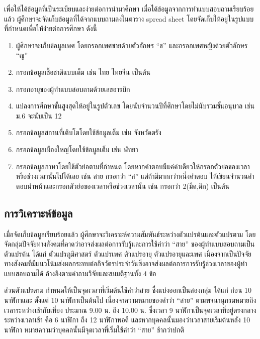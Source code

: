 \documentclass[a4paper]{article}
\begin{document}
    เพื่อให้ได้ข้อมูลที่เป็นระเบียบและง่ายต่อการนำมาศึกษา เมื่อได้ข้อมูลจากการทำแบบสอบถามเรียบร้อยแล้ว ผู้ศึกษาจะจัดเก็บข้อมูลที่ได้จากแบบถามลงในตาราง spread sheet โดยจัดเก็บให้อยู่ในรูปแบบที่กำหนดเพื่อให้ง่ายต่อการศึกษา ดังนี้
    \begin{enumerate}
        \item ผู้ศึกษาจะเก็บข้อมูลเพศ โดยกรอกเพศชายด้วยตัวอักษร “ช” และกรอกเพศหญิงด้วยตัวอักษร “ญ”
        \item กรอกข้อมูลเชื้อชาติแบบเต็ม เช่น ไทย ไทยจีน เป็นต้น
        \item กรอกอายุของผู้ทำแบบสอบถามด้วยเลขอารบิก
        \item แปลงการศึกษาขั้นสูงสุดให้อยู่ในรูปตัวเลข โดยนับจำนวนปีที่ศึกษาโดยไม่นับรวมชั้นอนุบาล เช่น ม.6 จะนับเป็น 12
        \item กรอกข้อมูลสถานที่เติบโตโดยใช้ข้อมูลเต็ม เช่น จังหวัดตรัง
        \item กรอกข้อมูลเมืองใหญ่โดยใช้ข้อมูลเต็ม เช่น พัทยา
        \item กรอกข้อมูลภาษาโดยใช้ตัวย่อตามที่กำหนด โดยหากคำตอบมีแค่คำเดียวให้กรอกตัวย่อของเวลาหรือช่วงเวลานั้นไปได้เลย เช่น สาย กรอกว่า “ส” แต่ถ้ามีมากกว่าหนึ่งคำตอบ ให้เขียนจำนวนคำตอบนำหน้าและกรอกตัวย่อของเวลาหรือช่วงเวลานั้น เช่น กรอกว่า 2(มืด,ดึก) เป็นต้น
    \end{enumerate}
\subsection{การวิเคราะห์ข้อมูล}
    เมื่อจัดเก็บข้อมูลเรียบร้อยแล้ว ผู้ศึกษาจะวิเคราะห์ความสัมพันธ์ระหว่างตัวแปรต้นและตัวแปรตาม โดยจัดกลุ่มปัจจัยทางสังคมที่คาดว่าอาจส่งผลต่อการรับรู้และการใช้คำว่า “สาย” ของผู้ทำแบบสอบถามเป็นตัวแปรต้น ได้แก่ ตัวแปรภูมิศาสตร์ ตัวแปรเพศ ตัวแปรอายุ ตัวแปรอายุและเพศ เนื่องจากเป็นปัจจัยทางสังคมที่มีแนวโน้มส่งผลกระทบต่อกิจวัตรประจำวันซึ่งอาจส่งผลต่อการการรับรู้ช่วงเวลาของผู้ทำแบบสอบถามได้ อ้างอิงตามคำถามวิจัยและสมมติฐานทั้ง 4 ข้อ

    ส่วนตัวแปรตาม กำหนดให้เป็นจุดเวลาที่เริ่มต้นใช้คำว่าสาย ซึ่งแบ่งออกเป็นสองกลุ่ม ได้แก่ ก่อน 10 นาฬิกาและ ตั้งแต่ 10 นาฬิกาเป็นต้นไป เนื่องจาความหมายของคำว่า “สาย” ตามพจนานุกรมหมายถึง เวลาระหว่างเช้ากับเที่ยง ประมาณ 9.00 น. ถึง 10.00 น. ซึ่งเวลา 9 นาฬิกาเป็นจุดเวลาที่อยู่ตรงกลางระหว่างเวลาเช้า คือ 6 นาฬิกา ถึง 12 นาฬิกาพอดี และหากบุคคลนั้นมองว่าเวลาสายเริ่มต้นหลัง 10 นาฬิกา หมายความว่าบุคคลนั้นมีจุดเวลาที่เริ่มใช้คำว่า “สาย” ช้ากว่าปกติ
\end{document}
